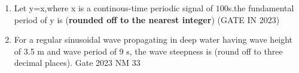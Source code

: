 \begin{enumerate}[label=\thechapter.\arabic*,ref=\thechapter.\theenumi]
\item Let y=x,where x is a continous-time periodic signal of $100$s.the fundamental period of y is (\textbf{rounded off to the nearest integer})
 \hfill(GATE IN 2023)\\
\solution
\pagebreak

\item For a regular sinusoidal wave propagating in deep water having wave height of 3.5 m and wave period of 9 s, the wave steepness is \underline{\hspace{1cm}} (round off to three decimal places).
\hfill Gate 2023 NM 33
\solution
\pagebreak

\end{enumerate}
